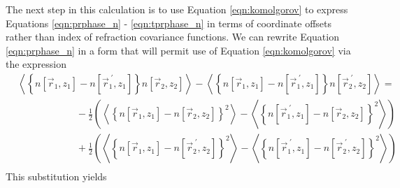 The next step in this calculation is to use Equation \ref{eqn:komolgorov}
to express Equations \ref{eqn:prphase_n} - \ref{eqn:tprphase_n} in terms of
coordinate offsets rather than index of refraction covariance
functions.  We can rewrite Equation \ref{eqn:prphase_n} in a form that
will permit use of Equation \ref{eqn:komolgorov} via the expression
\begin{equation}\label{eqn:simplify}
\begin{split}
&\left\langle \left\{n\left[\vec{r}_{1},z_{1}\right] - n\left[\vec{r}^{\;\prime}_{1},z_{1}\right]\right\}n\left[\vec{r}_{2},z_{2}\right]\right\rangle -
\left\langle \left\{n\left[\vec{r}_{1},z_{1}\right] - n\left[\vec{r}^{\;\prime}_{1},z_{1}\right]\right\}n\left[\vec{r}^{\;\prime}_{2},z_{2}\right]\right\rangle = \\
&\quad\quad\quad\quad\quad\quad
-\frac{1}{2} \left(\left\langle \left\{n\left[\vec{r}_{1},z_{1}\right] - n\left[\vec{r}_{2},z_{2}\right]\right\}^{2}\right\rangle - 
\left\langle \left\{n\left[\vec{r}^{\;\prime}_{1},z_{1}\right] - n\left[\vec{r}_{2},z_{2}\right]\right\}^{2}\right\rangle\right) \\
&\quad\quad\quad\quad\quad\quad
+\frac{1}{2} \left(\left\langle \left\{n\left[\vec{r}_{1},z_{1}\right] - n\left[\vec{r}^{\;\prime}_{2},z_{2}\right]\right\}^{2}\right\rangle - 
\left\langle \left\{n\left[\vec{r}^{\;\prime}_{1},z_{1}\right] - n\left[\vec{r}^{\;\prime}_{2},z_{2}\right]\right\}^{2}\right\rangle\right) \\
\end{split}
\end{equation}
This substitution yields
